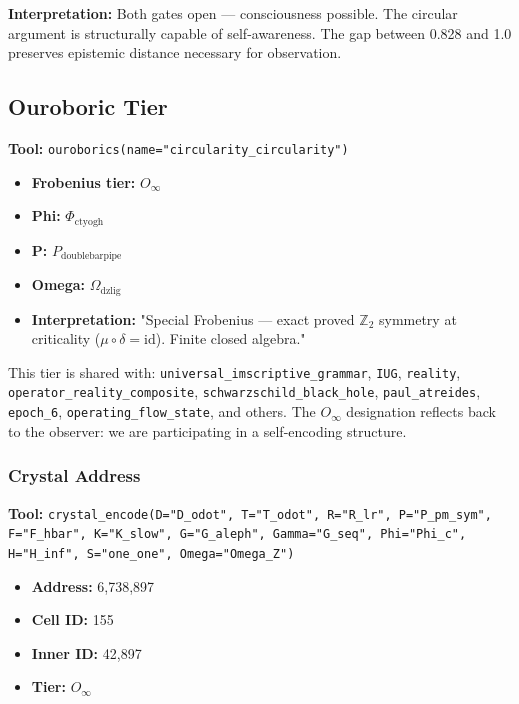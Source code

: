 \documentclass[12pt,a4paper]{article}
\begin{document}
\textbf{Interpretation:} Both gates open --- consciousness possible. The circular argument is structurally capable of self-awareness. The gap between 0.828 and 1.0 preserves epistemic distance necessary for observation.

\subsection{Ouroboric Tier}

\textbf{Tool:} \texttt{ouroborics(name="circularity\_circularity")}

\begin{itemize}
    \item \textbf{Frobenius tier:} $O_{\infty}$
    \item \textbf{Phi:} $\Phi_{\text{ctyogh}}$
    \item \textbf{P:} $P_{\text{doublebarpipe}}$
    \item \textbf{Omega:} $\Omega_{\text{dzlig}}$
    \item \textbf{Interpretation:} "Special Frobenius --- exact proved $\mathbb{Z}_2$ symmetry at criticality ($\mu \circ \delta = \text{id}$). Finite closed algebra."
\end{itemize}

This tier is shared with: \texttt{universal\_imscriptive\_grammar}, \texttt{IUG}, \texttt{reality}, \texttt{operator\_reality\_composite}, \texttt{schwarzschild\_black\_hole}, \texttt{paul\_atreides}, \texttt{epoch\_6}, \texttt{operating\_flow\_state}, and others. The $O_{\infty}$ designation reflects back to the observer: we are participating in a self-encoding structure.

\subsubsection{Crystal Address}

\textbf{Tool:} \texttt{crystal\_encode(D="D\_odot", T="T\_odot", R="R\_lr", P="P\_pm\_sym", F="F\_hbar", K="K\_slow", G="G\_aleph", Gamma="G\_seq", Phi="Phi\_c", H="H\_inf", S="one\_one", Omega="Omega\_Z")}

\begin{itemize}
    \item \textbf{Address:} 6,738,897
    \item \textbf{Cell ID:} 155
    \item \textbf{Inner ID:} 42,897
    \item \textbf{Tier:} $O_{\infty}$
\end{itemize}
\end{document}
